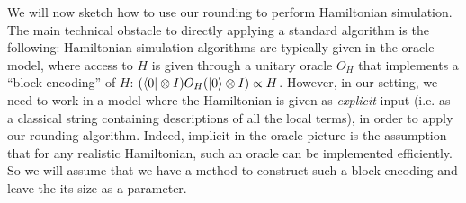 \documentclass[11pt]{article}
\theoremstyle{plain}
\newtheorem{theorem}{Theorem}[section]
\newcommand{\eps}{\varepsilon}
\begin{document}
We will now sketch how to use our rounding to perform Hamiltonian simulation. The main technical obstacle to directly applying a standard algorithm is the following: Hamiltonian simulation algorithms are typically given in the oracle model, where access to $H$ is given through a unitary oracle $O_H$ that implements a ``block-encoding'' of $H$: $(\bra{0}\otimes I)O_H (\ket{0} \otimes I) \propto H$. However, in our setting, we need to work in a model where the Hamiltonian is given as \emph{explicit} input (i.e. as a classical string containing descriptions of all the local terms), in order to apply our rounding algorithm. Indeed, implicit in the oracle picture is the assumption that for any realistic Hamiltonian, such an oracle can be implemented efficiently. So we will assume that we have a method to construct such a block encoding and leave the its size as a parameter.
\end{document}
